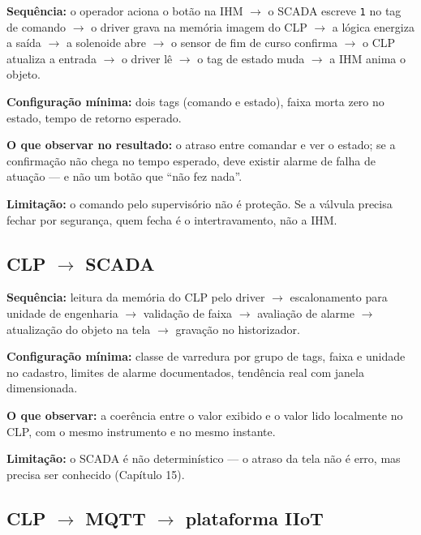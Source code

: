 \textbf{Sequência:} o operador aciona o botão na IHM \ensuremath{\rightarrow} o SCADA escreve \passthrough{\lstinline!1!} no tag de comando \ensuremath{\rightarrow} o driver
grava na memória imagem do CLP \ensuremath{\rightarrow} a lógica energiza a saída \ensuremath{\rightarrow} a solenoide abre \ensuremath{\rightarrow} o sensor de fim de
curso confirma \ensuremath{\rightarrow} o CLP atualiza a entrada \ensuremath{\rightarrow} o driver lê \ensuremath{\rightarrow} o tag de estado muda \ensuremath{\rightarrow} a IHM anima o
objeto.

\textbf{Configuração mínima:} dois tags (comando e estado), faixa morta zero no estado, tempo de retorno
esperado.

\textbf{O que observar no resultado:} o atraso entre comandar e ver o estado; se a confirmação não chega
no tempo esperado, deve existir alarme de falha de atuação --- e não um botão que ``não fez nada''.

\textbf{Limitação:} o comando pelo supervisório não é proteção. Se a válvula precisa fechar por segurança,
quem fecha é o intertravamento, não a IHM.

\subsection{\texorpdfstring{CLP \ensuremath{\rightarrow} SCADA}{CLP  SCADA}}\label{clp-scada}

\textbf{Sequência:} leitura da memória do CLP pelo driver \ensuremath{\rightarrow} escalonamento para unidade de engenharia \ensuremath{\rightarrow}
validação de faixa \ensuremath{\rightarrow} avaliação de alarme \ensuremath{\rightarrow} atualização do objeto na tela \ensuremath{\rightarrow} gravação no historizador.

\textbf{Configuração mínima:} classe de varredura por grupo de tags, faixa e unidade no cadastro, limites
de alarme documentados, tendência real com janela dimensionada.

\textbf{O que observar:} a coerência entre o valor exibido e o valor lido localmente no CLP, com o mesmo
instrumento e no mesmo instante.

\textbf{Limitação:} o SCADA é não determinístico --- o atraso da tela não é erro, mas precisa ser conhecido
(Capítulo 15).

\subsection{\texorpdfstring{CLP \ensuremath{\rightarrow} MQTT \ensuremath{\rightarrow} plataforma IIoT}{CLP  MQTT  plataforma IIoT}}\label{clp-mqtt-plataforma-iiot}

